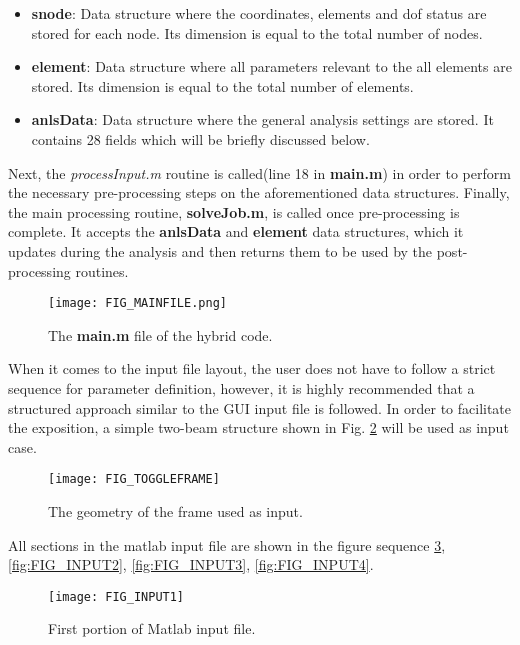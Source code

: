 \begin{appendices}
\begin{itemize}
	\item \textbf{snode}: Data structure where the coordinates, elements and 
	\acrshort{dof} status are stored for each node. Its dimension is equal to 
	the total number of nodes.
	\item \textbf{element}: Data structure where all parameters relevant to the 
	all elements are stored. Its dimension is equal to the total number of 
	elements.
	\item \textbf{anlsData}: Data structure where the general analysis settings 
	are stored. It contains 28 fields which will be briefly discussed below.
\end{itemize}

Next, the \textit{processInput.m} routine is called(line 18 in \textbf{main.m}) 
in order to perform the necessary pre-processing steps on the aforementioned 
data structures. Finally, the main processing routine, \textbf{solveJob.m}, is 
called once pre-processing is complete. It accepts the \textbf{anlsData} and 
\textbf{element} data structures, which it updates during the analysis and then 
returns them to be used by the post-processing routines.

\begin{figure}[t]
	\centering
	\texttt{[image: FIG\_MAINFILE.png]}
	\caption{The \textbf{main.m} file of the hybrid code.}
	\label{fig:MAINFILE}
\end{figure}

When it comes to the input file layout, the user does not have to follow a 
strict sequence for parameter definition, however, it is highly recommended 
that a structured approach similar to the GUI input file is followed. In order 
to facilitate the exposition, a simple two-beam structure shown in Fig. 
\ref{fig:FIG_TOGGLEFRAME} will be used as input case. 

\begin{figure}
	\centering
	\texttt{[image: FIG\_TOGGLEFRAME]}
	\caption{The geometry of the frame used as input.}
	\label{fig:FIG_TOGGLEFRAME}
\end{figure}

All sections in the matlab input file are shown in the figure sequence 
\ref{fig:FIG_INPUT1}, \ref{fig:FIG_INPUT2}, \ref{fig:FIG_INPUT3}, 
\ref{fig:FIG_INPUT4}.

\begin{figure}
	\centering
	\texttt{[image: FIG\_INPUT1]}
	\caption{First portion of Matlab input file.}
	\label{fig:FIG_INPUT1}
\end{figure}


\end{appendices}
